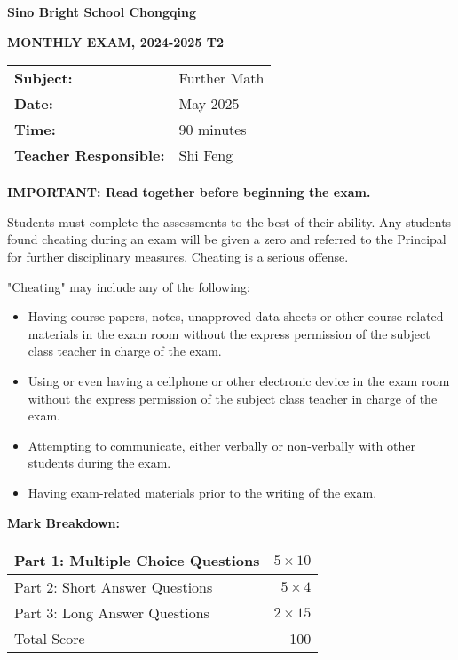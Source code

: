 \documentclass[12pt]{article}
\begin{document}
\begin{center}
\textbf{Sino Bright School Chongqing}

\vspace{0.5cm}
\Large\textbf{MONTHLY EXAM, 2024-2025 T2}

\vspace{1cm}
\begin{tabular}{ll}
\textbf{Subject:} & Further Math \\
\textbf{Date:} & May 2025 \\
\textbf{Time:} & 90 minutes \\
\textbf{Teacher Responsible:} & Shi Feng \\
\end{tabular}
\end{center}

\vspace{1cm}
\noindent\textbf{IMPORTANT: Read together before beginning the exam.}

\smallskip
\noindent Students must complete the assessments to the best of their ability. Any students found cheating during an exam will be given a zero and referred to the Principal for further disciplinary measures. Cheating is a serious offense.

\medskip
\noindent "Cheating" may include any of the following:
\begin{itemize}[leftmargin=*]
    \item Having course papers, notes, unapproved data sheets or other course-related materials in the exam room without the express permission of the subject class teacher in charge of the exam.
    
    \item Using or even having a cellphone or other electronic device in the exam room without the express permission of the subject class teacher in charge of the exam.
    
    \item Attempting to communicate, either verbally or non-verbally with other students during the exam.
    
    \item Having exam-related materials prior to the writing of the exam.
\end{itemize}

\vspace{0.5cm}
\noindent\textbf{Mark Breakdown:}
\begin{center}
\begin{tabular}{|l|r|}
\hline
Part 1: Multiple Choice Questions & $5 \times 10$ \\ \hline 
Part 2: Short Answer Questions & $5 \times 4$ \\ \hline
Part 3: Long Answer Questions & $2 \times 15$ \\ \hline
Total Score & 100 \\ \hline
\end{tabular}
\end{center}
\end{document}
